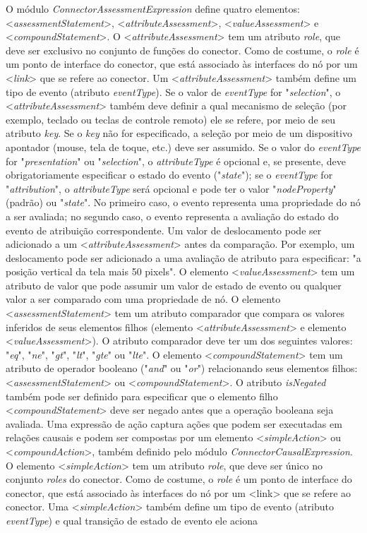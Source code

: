 O módulo \textit{ConnectorAssessmentExpression} define quatro elementos: <\textit{assessmentStatement}>, <\textit{attributeAssessment}>, <\textit{valueAssessment}> e <\textit{compoundStatement}>.
O <\textit{attributeAssessment}> tem um atributo \textit{role}, que deve ser exclusivo no conjunto de funções do conector. Como de costume, o \textit{role} é um ponto de interface do conector, que está associado às interfaces do nó por um <\textit{link}> que se refere ao conector. Um <\textit{attributeAssessment}> também define um tipo de evento (atributo \textit{eventType}). Se o valor de \textit{eventType} for "\textit{selection}", o <\textit{attributeAssessment}> também deve definir a qual mecanismo de seleção (por exemplo, teclado ou teclas de controle remoto) ele se refere, por meio de seu atributo \textit{key}. Se o \textit{key} não for especificado, a seleção por meio de um dispositivo apontador (mouse, tela de toque, etc.) deve ser assumido. Se o valor do \textit{eventType} for "\textit{presentation}" ou "\textit{selection}", o \textit{attributeType} é opcional e, se presente, deve obrigatoriamente especificar o estado do evento ("\textit{state}"); se o \textit{eventType} for "\textit{attribution}", o \textit{attributeType} será opcional e pode ter o valor "\textit{nodeProperty}" (padrão) ou "\textit{state}". No primeiro caso, o evento representa uma propriedade do nó a ser avaliada; no segundo caso, o evento representa a avaliação do estado do evento de atribuição correspondente. Um valor de deslocamento pode ser adicionado a um <\textit{attributeAssessment}> antes da comparação. Por exemplo, um deslocamento pode ser adicionado a uma avaliação de atributo para especificar: "a posição vertical da tela mais 50 pixels". O elemento <\textit{valueAssessment}> tem um atributo de valor que pode assumir um valor de estado de evento ou qualquer valor a ser comparado com uma propriedade de nó. O elemento <\textit{assessmentStatement}> tem um atributo comparador que compara os valores inferidos de seus elementos filhos (elemento <\textit{attributeAssessment}> e elemento <\textit{valueAssessment}>). O atributo comparador deve ter um dos seguintes valores: "\textit{eq}", "\textit{ne}", "\textit{gt}", "\textit{lt}", "\textit{gte}" ou "\textit{lte}". O elemento <\textit{compoundStatement}> tem um atributo de operador booleano ("\textit{and}" ou "\textit{or}") relacionando seus elementos filhos: <\textit{assessmentStatement}> ou <\textit{compoundStatement}>. O atributo \textit{\textit{isNegated}} também pode ser definido para especificar que o elemento filho <\textit{compoundStatement}> deve ser negado antes que a operação booleana seja avaliada. Uma expressão de ação captura ações que podem ser executadas em relações causais e podem ser compostas por um elemento <\textit{simpleAction}> ou <\textit{compoundAction}>, também definido pelo módulo \textit{ConnectorCausalExpression}. O elemento <\textit{simpleAction}> tem um atributo \textit{role}, que deve ser único no conjunto \textit{roles} do conector. Como de costume, o \textit{role} é um ponto de interface do conector, que está associado às interfaces do nó por um <link> que se refere ao conector. Uma <\textit{simpleAction}> também define um tipo de evento (atributo \textit{eventType}) e qual transição de estado de evento ele aciona 